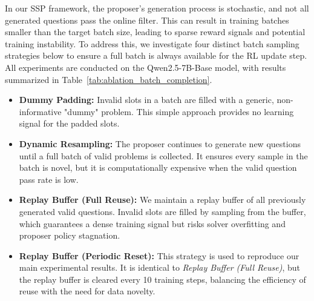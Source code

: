 \documentclass[10pt, a4paper, logo]{googledeepmind} %
\begin{document}
In our SSP framework, the proposer's generation process is stochastic, and not all generated questions pass the online filter. This can result in training batches smaller than the target batch size, leading to sparse reward signals and potential training instability. To address this, we investigate four distinct batch sampling strategies below to ensure a full batch is always available for the RL update step. All experiments are conducted on the Qwen2.5-7B-Base model, with results summarized in Table~\ref{tab:ablation_batch_completion}.
\begin{itemize}
    \item \textbf{Dummy Padding:} Invalid slots in a batch are filled with a generic, non-informative "dummy" problem. This simple approach provides no learning signal for the padded slots.
    \item \textbf{Dynamic Resampling:} The proposer continues to generate new questions until a full batch of valid problems is collected. It ensures every sample in the batch is novel, but it is computationally expensive when the valid question pass rate is low.
    \item \textbf{Replay Buffer (Full Reuse):} We maintain a replay buffer of all previously generated valid questions. Invalid slots are filled by sampling from the buffer, which guarantees a dense training signal but risks solver overfitting and proposer policy stagnation.
    \item \textbf{Replay Buffer (Periodic Reset):} This strategy is used to reproduce our main experimental results. It is identical to \textit{Replay Buffer (Full Reuse)}, but the replay buffer is cleared every 10 training steps, balancing the efficiency of reuse with the need for data novelty.
\end{itemize}

\begin{table}[t]
\caption{Ablation study on batch sampling strategies. Performance is evaluated on Qwen2.5-7B-Base. The Periodic Reset strategy yields the best results, highlighting the importance of striking a balance between data reuse and novelty.}
\label{tab:ablation_batch_completion}
\centering
{}
\end{table}
\end{document}

